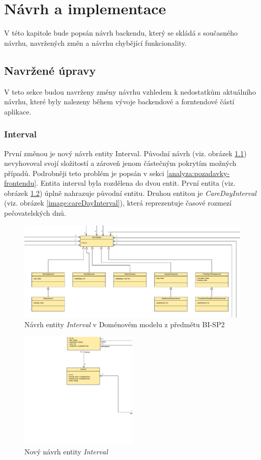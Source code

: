 \chapter{Návrh a implementace}
V této kapitole bude popsán návrh backendu, který se skládá s současného návrhu, navržených změn a návrhu chybějící funkcionality.
\section{Navržené úpravy}\label{navrh:upravy}
    V teto sekce budou navrženy změny návrhu vzhledem k nedostatkům aktuálního návrhu, které byly nalezeny během vývoje backendové a forntendové částí aplikace. 
    
    \subsection{Interval}\label{narh:upravy:interval}
        První změnou je nový návrh entity Interval. Původní návrh (viz. obrázek \ref{image:Interval1}) nevyhovoval svojí složitostí a zároveň jenom částečným pokrytím možných případů. Podrobněji teto problém je popsán v sekci \ref{analyza:pozadavky-frontendu}. Entita interval byla rozdělena do dvou entit. První entita (viz. obrázek \ref{image:Interval2}) úplně nahrazuje původní entitu. Druhou entitou je \textit{CareDayInterval} (viz. obrázek \ref{image:careDayInterval}), která reprezentuje časové rozmezí pečovatelských dnů.
        \begin{figure}\centering
	        \includegraphics[width=1.0\textwidth]{pdfs/Interval1}
	        \caption[Návrh intervalu]{Návrh entity \textit{Interval} v Doménovém modelu z předmětu BI-SP2}\label{image:Interval1}
        \end{figure}
        \begin{figure}\centering
	        \includegraphics[width=0.5\textwidth]{pdfs/Interval2}
	        \caption[Návrh intervalu]{Nový návrh entity \textit{Interval}}\label{image:Interval2}
        \end{figure}
